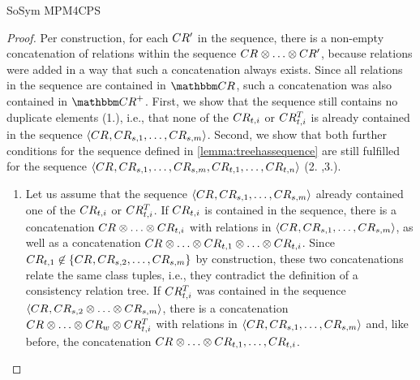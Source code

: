 \begin{copiedFrom}{SoSym MPM4CPS}
\begin{proof}
    Per construction, for each $CR'_{}$ in the sequence, there is a non-empty concatenation of relations within the sequence $\consistencyrelation{CR}{} \concat \dots \concat \consistencyrelation{CR'}{}$, because relations were added in a way that such a concatenation always exists. Since all relations in the sequence are contained in $\consistencyrelationset{CR}$, such a concatenation was also contained in $\transitiveclosure{\consistencyrelationset{CR}}$.
    First, we show that the sequence still contains no duplicate elements (1.), i.e., that none of the $CR_{t,i}$ or $CR^T_{t,i}$ is already contained in the sequence $\langle CR_{}, CR_{s,1}, \dots, CR_{s,m} \rangle$. 
    Second, we show that both further conditions for the sequence defined in \autoref{lemma:treehassequence} are still fulfilled for the sequence $\langle CR_{}, CR_{s,1}, \dots, CR_{s,m}, CR_{t,1}, \dots, CR_{t,n} \rangle$ (2. ,3.).
    \begin{enumerate}
        \item
    Let us assume that the sequence $\langle CR_{}, CR_{s,1}, \dots, CR_{s,m} \rangle$ already contained one of the $CR_{t,i}$ or $CR^T_{t,i}$. If $CR_{t,i}$ is contained in the sequence, there is a concatenation $\consistencyrelation{CR}{} \concat \dots \concat \consistencyrelation{CR}{t,i}$ with relations in $\langle CR_{}, CR_{s,1}, \dots, CR_{s,m} \rangle$, as well as a concatenation $\consistencyrelation{CR}{} \concat \dots \concat \consistencyrelation{CR}{t,1} \concat \dots \concat \consistencyrelation{CR}{t,i}$.
    Since $CR_{t,1} \not\in \{ CR_{}, CR_{s,2}, \dots, CR_{s,m} \}$ by construction, these two concatenations relate the same class tuples, i.e., they contradict the definition of a consistency relation tree.
    If $CR^T_{t,i}$ was contained in the sequence $\tupled{\consistencyrelation{CR}{}, \consistencyrelation{CR}{s,2} \concat \dots \concat \consistencyrelation{CR}{s,m}}$, there is a concatenation $\consistencyrelation{CR}{} \concat \dots \concat \consistencyrelation{CR}{w} \concat \consistencyrelation{CR^T}{t,i}$ with relations in $\langle CR_{}, CR_{s,1}, \dots, CR_{s,m} \rangle$ and, like before, the concatenation $\consistencyrelation{CR}{} \concat \dots \concat \consistencyrelation{CR}{t,1}, \dots, \consistencyrelation{CR}{t,i}$.

\end{enumerate}
\end{proof}
\end{copiedFrom}
